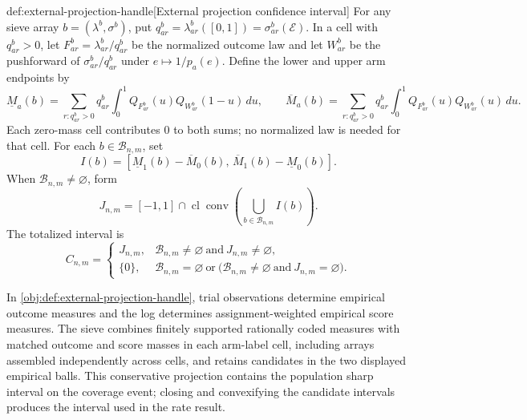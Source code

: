 \documentclass[11pt]{article}
\begin{document}
\begin{definitionv}{def:external-projection-handle}[External projection confidence interval]
For any sieve array \(b=(\lambda^b,\sigma^b)\), put \(q^b_{ar}=\lambda^b_{ar}([0,1])=\sigma^b_{ar}(\mathcal E)\). In a cell with \(q^b_{ar}>0\), let \(F^b_{ar}=\lambda^b_{ar}/q^b_{ar}\) be the normalized outcome law and let \(W^b_{ar}\) be the pushforward of \(\sigma^b_{ar}/q^b_{ar}\) under \(e\mapsto 1/p_a(e)\). Define the lower and upper arm endpoints by
\[
\underline M_a(b)=\sum_{r:q^b_{ar}>0}q^b_{ar}\int_0^1 Q_{F^b_{ar}}(u)Q_{W^b_{ar}}(1-u)\,du,
\qquad
\overline M_a(b)=\sum_{r:q^b_{ar}>0}q^b_{ar}\int_0^1 Q_{F^b_{ar}}(u)Q_{W^b_{ar}}(u)\,du.
\]
Each zero-mass cell contributes \(0\) to both sums; no normalized law is needed for that cell. For each \(b\in\mathcal B_{n,m}\), set
\[
I(b)=[\underline M_1(b)-\overline M_0(b),\,\overline M_1(b)-\underline M_0(b)].
\]
When \(\mathcal B_{n,m}\ne\varnothing\), form
\[
J_{n,m}
=
[-1,1]\cap
\operatorname{cl}\operatorname{conv}
\left(\bigcup_{b\in\mathcal B_{n,m}}I(b)\right).
\]
The totalized interval is
\[
C_{n,m}
=
\begin{cases}
J_{n,m},&
\mathcal B_{n,m}\ne\varnothing\ \text{and}\ J_{n,m}\ne\varnothing,\\
\{0\},&
\mathcal B_{n,m}=\varnothing\ \text{or}\
\bigl(\mathcal B_{n,m}\ne\varnothing\ \text{and}\ J_{n,m}=\varnothing\bigr).
\end{cases}
\]
\end{definitionv}

In \cref{obj:def:external-projection-handle}, trial observations determine empirical outcome measures and the log determines assignment-weighted empirical score measures. The sieve combines finitely supported rationally coded measures with matched outcome and score masses in each arm-label cell, including arrays assembled independently across cells, and retains candidates in the two displayed empirical balls. This conservative projection contains the population sharp interval on the coverage event; closing and convexifying the candidate intervals produces the interval  used in the rate result.
\end{document}
